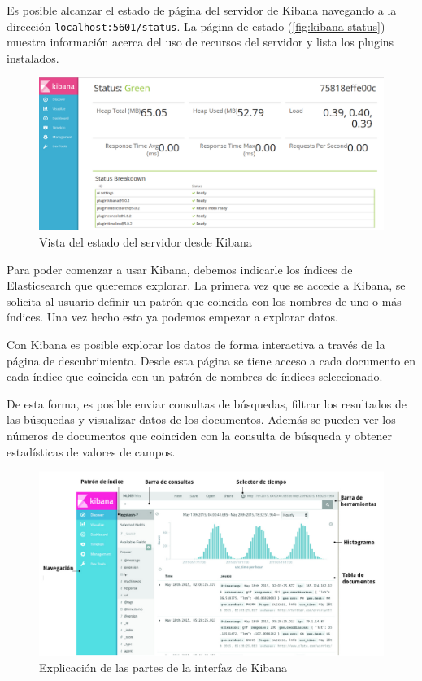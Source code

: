 Es posible alcanzar el estado de página del servidor de Kibana navegando a la dirección \lstinline{localhost:5601/status}. La página de estado (\autoref{fig:kibana-status}) muestra información acerca del uso de recursos del servidor y lista los plugins instalados.

\begin{figure}
  \includegraphics[width=\linewidth]{src/images/05-capitulo-5/kibanastatus.jpg}
  \caption{Vista del estado del servidor desde Kibana}
  \label{fig:kibana-status}
\end{figure}


Para poder comenzar a usar Kibana, debemos indicarle los índices de Elasticsearch que queremos explorar. La primera vez que se accede a Kibana, se solicita al usuario definir un patrón que coincida con los nombres de uno o más índices. Una vez hecho esto ya podemos empezar a explorar datos.



Con Kibana es posible explorar los datos de forma interactiva a través de la página de descubrimiento. Desde esta página se tiene acceso a cada documento en cada índice que coincida con un patrón de nombres de índices seleccionado.

De esta forma, es posible enviar consultas de búsquedas, filtrar los resultados de las búsquedas y visualizar datos de los documentos. Además se pueden ver los números de documentos que coinciden con la consulta de búsqueda y obtener estadísticas de valores de campos.

\begin{figure}
  \includegraphics[width=\linewidth]{src/images/05-capitulo-5/kibana-ux.png}
  \caption{Explicación de las partes de la interfaz de Kibana}
  \label{fig:kibana-ux}
\end{figure}


